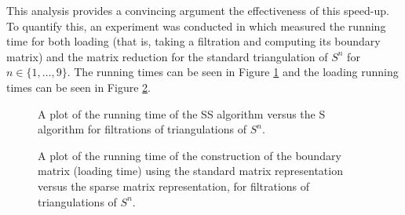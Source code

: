 This analysis provides a convincing argument the effectiveness of this speed-up. To quantify this, an experiment was conducted in which measured the running time for both loading (that is, taking a filtration and computing its boundary matrix) and the matrix reduction for the standard triangulation of $S^n$ for $n \in \{1, \ldots, 9\}$. The running times can be seen in Figure \ref{fig:speedups-1v2-compute} and the loading running times can be seen in Figure \ref{fig:speedups-1v2-load}.

\begin{figure}
  \caption{A plot of the running time of the \textsc{SS} algorithm versus the \textsc{S} algorithm for filtrations of triangulations of $S^n$.}
  \label{fig:speedups-1v2-compute}
\end{figure}

\begin{figure}
  \caption{A plot of the running time of the construction of the boundary matrix (loading time) using the standard matrix representation versus the sparse matrix representation, for filtrations of triangulations of $S^n$.}
  \label{fig:speedups-1v2-load}
\end{figure}

